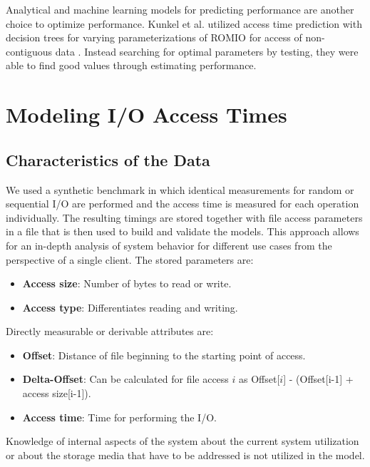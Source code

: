 \documentclass{superfri}
\begin{document}
Analytical and machine learning models for predicting performance are another choice to optimize performance.
Kunkel et al. utilized access time prediction with decision trees for varying parameterizations of ROMIO for access of non-contiguous data \cite{UMLTPTPONI15}. 
Instead searching for optimal parameters by testing, they were able to find good values through estimating performance.


\section{Modeling I/O Access Times}
\label{modeling_access_times}
\subsection{Characteristics of the Data}
We used a synthetic benchmark in which identical measurements for random or sequential I/O are performed and the access time is measured for each operation individually.
The resulting timings are stored together with file access parameters in a file that is then used to build and validate the models.
This approach allows for an in-depth analysis of system behavior for different use cases from the perspective of a single client.
The stored parameters are:
\begin{itemize}
	\item \textbf{Access size}: Number of bytes to read or write.
	\item \textbf{Access type}: Differentiates reading and writing.
\end{itemize}
Directly measurable or derivable attributes are:
\begin{itemize}
	\item \textbf{Offset}: Distance of file beginning to the starting point of access.
	\item \textbf{Delta-Offset}: Can be calculated for file access $i$ as Offset[$i$] - (Offset[i-1] + access size[i-1]).
	\item \textbf{Access time}: Time for performing the I/O.
\end{itemize}
Knowledge of internal aspects of the system about the current system utilization or about the storage media that have to be addressed is not utilized in the model.
\end{document}
